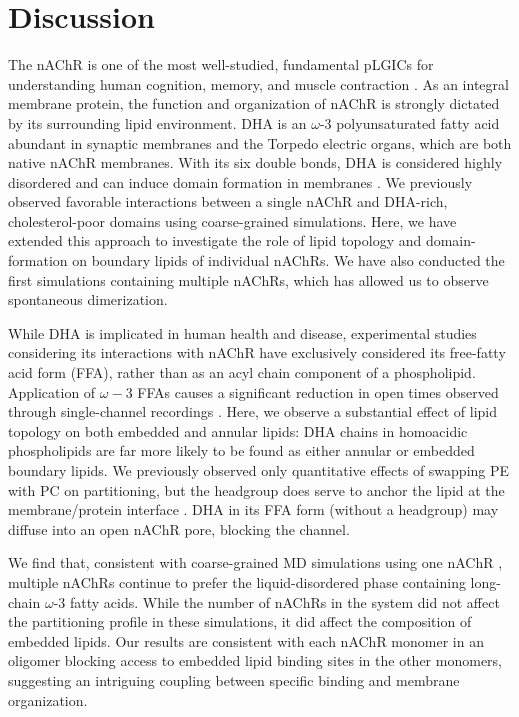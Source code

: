 \section{Discussion} 

The nAChR is one of the most well-studied, fundamental pLGICs for understanding human cognition, memory, and muscle contraction \citep{Gotti1997}. As an integral membrane protein, the function and organization of nAChR is strongly dictated by its surrounding lipid environment. DHA is an $\omega$-3 polyunsaturated fatty acid abundant in synaptic membranes and the Torpedo electric organs, which are both native nAChR membranes. With its six double bonds, DHA is considered highly disordered and can induce domain formation in membranes \citep{S000930840800032720080101}. We previously observed \citep{Sharp2019} favorable interactions between a single nAChR and DHA-rich, cholesterol-poor domains using coarse-grained simulations. Here, we have extended this approach to investigate the role of lipid topology and domain-formation on boundary lipids of individual nAChRs. We have also conducted the first simulations containing multiple nAChRs, which has allowed us to observe spontaneous dimerization.  

While DHA is implicated in human health and disease, \citep{12439486320170901} experimental studies considering its interactions with nAChR have exclusively considered its free-fatty acid form (FFA), \citep{Antollini2016} %
rather than as an acyl chain component of a phospholipid. Application of $\omega-3$ FFAs causes a significant reduction in open times observed through single-channel recordings  \citep{Bouzat1993}. Here, we observe a substantial effect of lipid topology on both embedded and annular lipids: DHA chains in homoacidic phospholipids are far more likely to be found as either annular or embedded boundary lipids.  We previously observed only quantitative effects of swapping PE with PC on partitioning, but the headgroup does serve to anchor the lipid at the membrane/protein interface  \citep{Sharp2019}.  DHA in its FFA form (without a headgroup) may diffuse into an open nAChR pore, blocking the channel. %

We find that, consistent with coarse-grained MD simulations using one nAChR \citep{Sharp2019}, multiple nAChRs continue to prefer the liquid-disordered phase containing long-chain $\omega$-3 fatty acids. While the number of nAChRs in the system did not affect the partitioning profile in these simulations, it did affect the composition of embedded lipids. Our results are consistent with each nAChR monomer in an oligomer blocking access to embedded lipid binding sites in the other monomers, suggesting an intriguing coupling between specific binding and membrane organization.  

